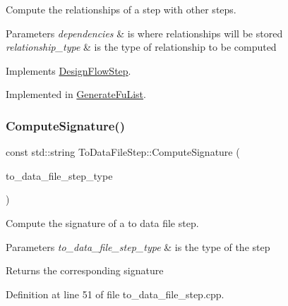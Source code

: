 Compute the relationships of a step with other steps. 


\begin{DoxyParams}{Parameters}
{\em dependencies} & is where relationships will be stored \\
\hline
{\em relationship\+\_\+type} & is the type of relationship to be computed \\
\hline
\end{DoxyParams}


Implements \hyperlink{classDesignFlowStep_a65bf7bcb603189a7ddcf930c3a9fd7fe}{Design\+Flow\+Step}.



Implemented in \hyperlink{classGenerateFuList_a3651813235effdc39f39dd064571a135}{Generate\+Fu\+List}.

\mbox{\label{classToDataFileStep_a0e5c20720eaf49db1a8a1e82c00d43f7}} 
\subsubsection{\texorpdfstring{Compute\+Signature()}{ComputeSignature()}}
{\footnotesize\ttfamily const std\+::string To\+Data\+File\+Step\+::\+Compute\+Signature (\begin{DoxyParamCaption}\item[{const \hyperlink{to__data__file__step_8hpp_a11e82da7dd30bcde03a139fc0baa4f38}{To\+Data\+File\+Step\+\_\+\+Type}}]{to\+\_\+data\+\_\+file\+\_\+step\+\_\+type }\end{DoxyParamCaption})\hspace{0.3cm}{\ttfamily [static]}}



Compute the signature of a to data file step. 


\begin{DoxyParams}{Parameters}
{\em to\+\_\+data\+\_\+file\+\_\+step\+\_\+type} & is the type of the step \\
\hline
\end{DoxyParams}
\begin{DoxyReturn}{Returns}
the corresponding signature 
\end{DoxyReturn}


Definition at line 51 of file to\+\_\+data\+\_\+file\+\_\+step.\+cpp.



